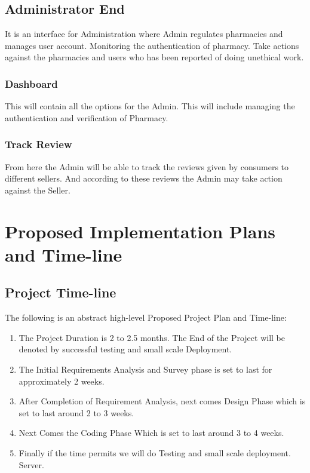 \documentclass[fleqn,10pt]{../SelfArx} %
\begin{document}
\subsection{Administrator End}
It is an interface for Administration where Admin regulates pharmacies and manages user account. Monitoring the authentication of pharmacy.
Take actions against the pharmacies and users who has been reported of doing unethical work.
\subsubsection{Dashboard}
This will contain all the options for the Admin. This will include managing the authentication and verification of Pharmacy.
\subsubsection{Track Review}
From here the Admin will be able to track the reviews given by consumers to different sellers. And according to these reviews the Admin may take action against the Seller.

\section{Proposed Implementation Plans and Time-line}

\subsection{Project Time-line}
The following is an abstract high-level Proposed Project Plan and Time-line:
\begin{enumerate}
\item The Project Duration is 2 to 2.5 months. The End of the Project will be denoted by successful testing and small scale Deployment.
\item The Initial Requirements Analysis and Survey phase is set to last for approximately 2 weeks.
\item After Completion of Requirement Analysis, next comes Design Phase which is set to last around 2 to 3 weeks.
\item Next Comes the Coding Phase Which is set to last around 3 to 4 weeks.
\item Finally if the time permits we will do Testing and small scale deployment.
Server.
\end{enumerate}
\end{document}

